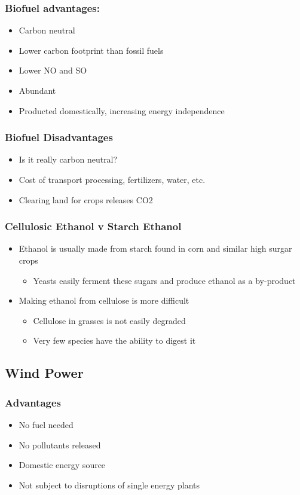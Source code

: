 \documentclass[11pt]{article}
\begin{document}
\subsubsection{Biofuel advantages:}
\label{sec:org29bcc8e}
\begin{itemize}
\item Carbon neutral
\item Lower carbon footprint than fossil fuels
\item Lower NO and SO
\item Abundant
\item Producted domestically, increasing energy independence
\end{itemize}
\subsubsection{Biofuel Disadvantages}
\label{sec:orge6d8850}
\begin{itemize}
\item Is it really carbon neutral?
\item Cost of transport processing, fertilizers, water, etc.
\item Clearing land for crops releases CO2
\end{itemize}
\subsubsection{Cellulosic Ethanol v Starch Ethanol}
\label{sec:orgbc5c9dd}
\begin{itemize}
\item Ethanol is usually made from starch found in corn and similar high surgar crops
\begin{itemize}
\item Yeasts easily ferment these sugars and produce ethanol as a by-product
\end{itemize}
\item Making ethanol from cellulose is more difficult
\begin{itemize}
\item Cellulose in grasses is not easily degraded
\item Very few species have the ability to digest it
\end{itemize}
\end{itemize}
\subsection{Wind Power}
\label{sec:orgec7175f}
\subsubsection{Advantages}
\label{sec:orgb1b961b}
\begin{itemize}
\item No fuel needed
\item No pollutants released
\item Domestic energy source
\item Not subject to disruptions of single energy plants
\end{itemize}
\end{document}
